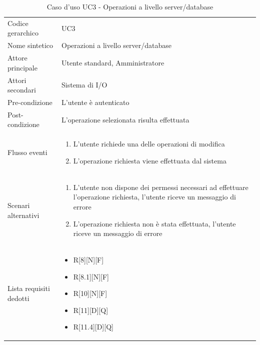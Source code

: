 \documentclass[a4paper]{report}
\begin{document}
		\begin{table}[H]
		\begin{tabularx}{\textwidth}{X | X}\toprule
			\rowcolor{orange!65}Codice gerarchico & UC3 \\
			Nome sintetico & Operazioni a livello server/database \\
			\rowcolor{orange!65}Attore principale & Utente standard, Amministratore\\
			Attori secondari & Sistema di I/O \\
			\rowcolor{orange!65}Pre-condizione & L'utente è autenticato\\
			Post-condizione & L'operazione selezionata risulta effettuata\\
			\rowcolor{orange!65}Flusso eventi & \begin{enumerate}
			\item L'utente richiede una delle operazioni di modifica
			\item L'operazione richiesta viene effettuata dal sistema
			\end{enumerate} \\
			Scenari alternativi & \begin{enumerate}
			\item L'utente non dispone dei permessi necessari ad effettuare l'operazione richiesta, l'utente
			riceve un messaggio di errore
			\item L'operazione richiesta non è stata effettuata, l'utente riceve un messaggio di errore
			\end{enumerate} \\
			\rowcolor{orange!65}Lista requisiti dedotti & \begin{itemize}
				\item R[8][N][F]
				\item R[8.1][N][F]
				\item R[10][N][F]
				\item R[11][D][Q]
				\item R[11.4][D][Q]
				\end{itemize} \\
			\bottomrule
		\end{tabularx}
		\caption{Caso d'uso UC3 - Operazioni a livello server/database}
	 \end{table}
\end{document}
